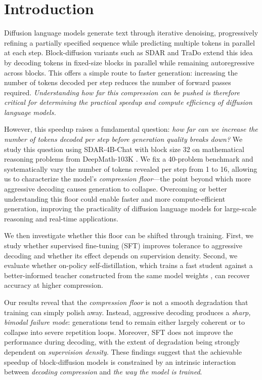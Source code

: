 \documentclass{article}
\begin{document}
\section{Introduction}
\label{sec:intro}

Diffusion language models generate text through iterative denoising, progressively refining a partially specified sequence while predicting multiple tokens in parallel at each step. Block-diffusion variants such as SDAR \citep{cheng2025sdar} and TraDo \citep{wang2025tracerl} extend this idea by decoding tokens in fixed-size blocks in parallel while remaining autoregressive across blocks. This offers a simple route to faster generation: increasing the number of tokens decoded per step reduces the number of forward passes required. \textit{Understanding how far this compression can be pushed is therefore critical for determining the practical speedup and compute efficiency of diffusion language models.}

However, this speedup raises a fundamental question: \textit{how far can we increase the number of tokens decoded per step before generation quality breaks down?} We study this question using SDAR-4B-Chat with block size 32 on mathematical reasoning problems from DeepMath-103K \citep{he2025deepmath}. We fix a 40-problem benchmark and systematically vary the number of tokens revealed per step from 1 to 16, allowing us to characterize the model's \textit{compression floor}---the point beyond which more aggressive decoding causes generation to collapse. Overcoming or better understanding this floor could enable faster and more compute-efficient generation, improving the practicality of diffusion language models for large-scale reasoning and real-time applications.

We then investigate whether this floor can be shifted through training. First, we study whether supervised fine-tuning (SFT) improves tolerance to aggressive decoding and whether its effect depends on supervision density. Second, we evaluate whether on-policy self-distillation, which trains a fast student against a better-informed teacher constructed from the same model weights \citep{zhao2026opsd}, can recover accuracy at higher compression.

Our results reveal that the \textit{compression floor} is not a smooth degradation that training can simply polish away. Instead, aggressive decoding produces a \textit{sharp, bimodal failure mode}: generations tend to remain either largely coherent or to collapse into severe repetition loops. Moreover, SFT does not improve the performance during decoding, with the extent of degradation being strongly dependent on \textit{supervision density}. These findings suggest that the achievable speedup of block-diffusion models is constrained by an intrinsic interaction between \textit{decoding compression} and \textit{the way the model is trained}.
\end{document}
